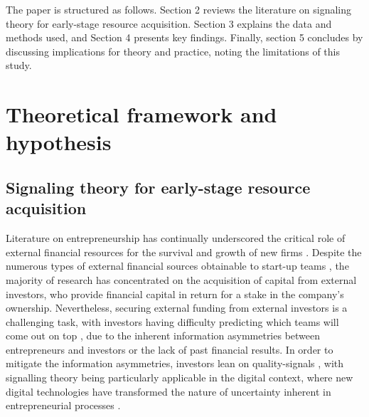 \documentclass[12pt]{article}
\begin{document}
The paper is structured as follows. Section 2 reviews the literature on signaling theory for early-stage resource acquisition. Section 3 explains the data and methods used, and Section 4 presents key findings. Finally, section 5 concludes by discussing implications for theory and practice, noting the limitations of this study.


\section{Theoretical framework and hypothesis}

\subsection{Signaling theory for early-stage resource acquisition}

Literature on entrepreneurship has continually underscored the critical role of external financial resources for the survival and growth of new firms \citep{cooper1994initial}. Despite the numerous types of external financial sources obtainable to start-up teams \citep{drover2017review, klein2020start}, the majority of research has concentrated on the acquisition of capital from external investors, who provide financial capital in return for a stake in the company's ownership. Nevertheless, securing external funding from external investors is a challenging task, with investors having difficulty predicting which teams will come out on top \citep{ghassemiautomated, duhigg2016google}, due to the inherent information asymmetries between entrepreneurs and investors or the lack of past financial results. In order to mitigate the information asymmetries, investors lean on quality-signals \citep{spence1978job, ko2018signaling}, with signalling theory being particularly applicable in the digital context, where new digital technologies have transformed the nature of uncertainty inherent in entrepreneurial processes \citep{nambisan2017digital}.
\end{document}
